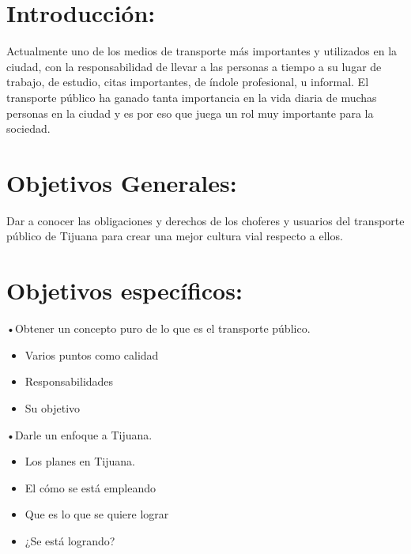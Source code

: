 \documentclass{bmcart}
\begin{document}


\section*{Introducción:}
Actualmente uno de los medios de transporte más importantes y utilizados en la ciudad, con la responsabilidad de llevar a las personas a tiempo a su lugar de trabajo, de estudio,  citas importantes, de índole profesional, u informal.  
El transporte público ha ganado tanta importancia en la vida diaria de muchas personas en la ciudad y es por eso que juega un rol muy importante para la sociedad.


\section*{Objetivos Generales:}

Dar a conocer las obligaciones y derechos de los choferes y usuarios del transporte público de Tijuana para crear una mejor cultura vial respecto a ellos.
%
\section*{Objetivos específicos: }
•Obtener un concepto puro de lo que es el transporte público.
\begin{itemize}
	\item Varios puntos como calidad
	\item Responsabilidades
	\item Su objetivo
\end{itemize}
•Darle un enfoque a Tijuana.
\begin{itemize}
	\item Los planes en Tijuana.
	\item El cómo se está empleando
	\item Que es lo que se quiere lograr
	\item ¿Se está logrando?
\end{itemize}
\end{document}
